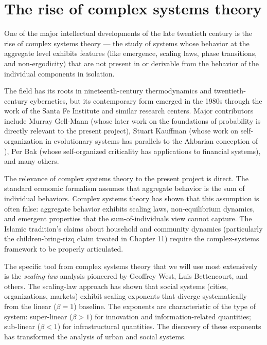 \section{The rise of complex systems theory}
\label{sec:complex-systems}

One of the major intellectual developments of the late twentieth
century is the rise of complex systems theory --- the study of
systems whose behavior at the aggregate level exhibits features (like
emergence, scaling laws, phase transitions, and non-ergodicity) that
are not present in or derivable from the behavior of the individual
components in isolation.

The field has its roots in nineteenth-century thermodynamics and
twentieth-century cybernetics, but its contemporary form emerged in
the 1980s through the work of the Santa Fe Institute and similar
research centers. Major contributors include Murray Gell-Mann (whose
later work on the foundations of probability is directly relevant to
the present project), Stuart Kauffman (whose work on self-organization
in evolutionary systems has parallels to the Akbarian conception of
), Per Bak (whose self-organized criticality has
applications to financial systems), and many others.

The relevance of complex systems theory to the present project is
direct. The standard economic formalism assumes that aggregate
behavior is the sum of individual behaviors. Complex systems theory
has shown that this assumption is often false: aggregate behavior
exhibits scaling laws, non-equilibrium dynamics, and emergent
properties that the sum-of-individuals view cannot capture. The
Islamic tradition's claims about household and community dynamics
(particularly the children-bring-rizq claim treated in Chapter 11)
require the complex-systems framework to be properly articulated.

The specific tool from complex systems theory that we will use most
extensively is the \emph{scaling-law} analysis pioneered by Geoffrey
West, Luis Bettencourt, and others. The scaling-law approach has
shown that social systems (cities, organizations, markets) exhibit
scaling exponents that diverge systematically from the linear
($\beta = 1$) baseline. The exponents are characteristic of the
type of system: super-linear ($\beta > 1$) for innovation and
information-related quantities; sub-linear ($\beta < 1$) for
infrastructural quantities. The discovery of these exponents has
transformed the analysis of urban and social systems.

